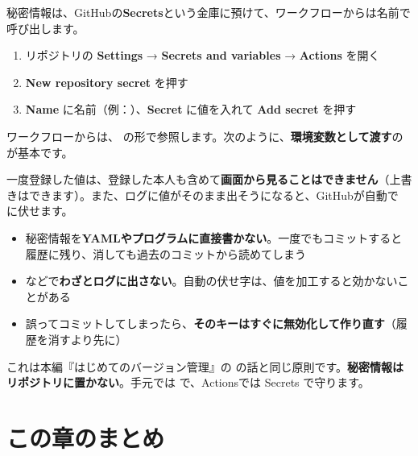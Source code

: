 秘密情報は、GitHubの\textbf{Secrets}という金庫に預けて、ワークフローからは名前で呼び出します。

\begin{enumerate}[leftmargin=1.6em]
  \item リポジトリの \textbf{Settings} → \textbf{Secrets and variables} → \textbf{Actions} を開く
  \item \textbf{New repository secret} を押す
  \item \textbf{Name} に名前（例：）、\textbf{Secret} に値を入れて \textbf{Add secret} を押す
\end{enumerate}

ワークフローからは、 の形で参照します。次のように、\textbf{環境変数として渡す}のが基本です。

\begin{codebox}[yaml]
\end{codebox}

一度登録した値は、登録した本人も含めて\textbf{画面から見ることはできません}（上書きはできます）。また、ログに値がそのまま出そうになると、GitHubが自動で \cmd{***} に伏せます。

\begin{warnbox}
\begin{itemize}[leftmargin=1.4em, nosep]
  \item 秘密情報を\textbf{YAMLやプログラムに直接書かない}。一度でもコミットすると履歴に残り、消しても過去のコミットから読めてしまう
  \item {} などで\textbf{わざとログに出さない}。自動の伏せ字は、値を加工すると効かないことがある
  \item 誤ってコミットしてしまったら、\textbf{そのキーはすぐに無効化して作り直す}（履歴を消すより先に）
\end{itemize}
\end{warnbox}

これは本編『はじめてのバージョン管理』の  の話と同じ原則です。\textbf{秘密情報はリポジトリに置かない}。手元では  で、Actionsでは Secrets で守ります。

\section*{この章のまとめ}

